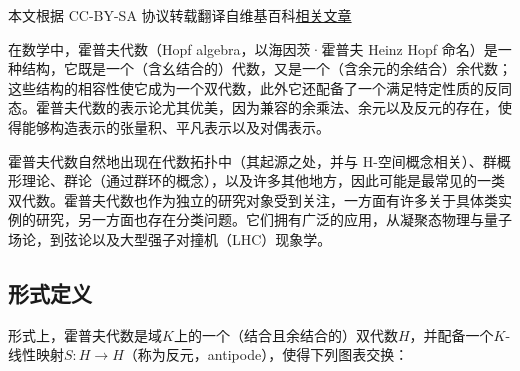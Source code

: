 
本文根据 CC-BY-SA 协议转载翻译自维基百科\href{https://en.wikipedia.org/wiki/Hopf_algebra}{相关文章}

在数学中，霍普夫代数（Hopf algebra，以海因茨·霍普夫 Heinz Hopf 命名）是一种结构，它既是一个（含幺结合的）代数，又是一个（含余元的余结合）余代数；这些结构的相容性使它成为一个双代数，此外它还配备了一个满足特定性质的反同态。霍普夫代数的表示论尤其优美，因为兼容的余乘法、余元以及反元的存在，使得能够构造表示的张量积、平凡表示以及对偶表示。

霍普夫代数自然地出现在代数拓扑中（其起源之处，并与 H-空间概念相关）、群概形理论、群论（通过群环的概念），以及许多其他地方，因此可能是最常见的一类双代数。霍普夫代数也作为独立的研究对象受到关注，一方面有许多关于具体类实例的研究，另一方面也存在分类问题。它们拥有广泛的应用，从凝聚态物理与量子场论，到弦论以及大型强子对撞机（LHC）现象学。
\subsection{形式定义}
形式上，霍普夫代数是域$K$上的一个（结合且余结合的）双代数$H$，并配备一个$K$-线性映射$S: H \to H$（称为反元，antipode），使得下列图表交换：
